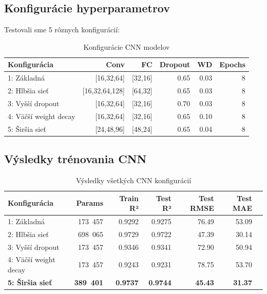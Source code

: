 \documentclass[a4paper, 12pt]{article}
\begin{document}
\subsection{Konfigurácie hyperparametrov}

Testovali sme 5 rôznych konfigurácií:

\begin{table}[H]
\centering
\small
\begin{tabular}{lrrrrr}
\toprule
\textbf{Konfigurácia} & \textbf{Conv} & \textbf{FC} & \textbf{Dropout} & \textbf{WD} & \textbf{Epochs} \\
\midrule
1: Základná & [16,32,64] & [32,16] & 0.65 & 0.03 & 8 \\
2: Hlbšia sieť & [16,32,64,128] & [64,32] & 0.65 & 0.03 & 8 \\
3: Vyšší dropout & [16,32,64] & [32,16] & 0.70 & 0.03 & 8 \\
4: Väčší weight decay & [16,32,64] & [32,16] & 0.65 & 0.10 & 8 \\
5: Širšia sieť & [24,48,96] & [48,24] & 0.65 & 0.04 & 8 \\
\bottomrule
\end{tabular}
\caption{Konfigurácie CNN modelov}
\end{table}

\clearpage

\subsection{Výsledky trénovania CNN}

\begin{table}[H]
\centering
\small
\begin{tabular}{lrrrrrr}
\toprule
\textbf{Konfigurácia} & \textbf{Params} & \textbf{Train R²} & \textbf{Test R²} & \textbf{Test RMSE} & \textbf{Test MAE} \\
\midrule
1: Základná & 173~457 & 0.9292 & 0.9275 & 76.49 & 53.09 \\
2: Hlbšia sieť & 698~065 & 0.9729 & 0.9722 & 47.39 & 30.14 \\
3: Vyšší dropout & 173~457 & 0.9346 & 0.9341 & 72.90 & 50.94 \\
4: Väčší weight decay & 173~457 & 0.9243 & 0.9231 & 78.75 & 53.70 \\
\textbf{5: Širšia sieť} & \textbf{389~401} & \textbf{0.9737} & \textbf{0.9744} & \textbf{45.43} & \textbf{31.37} \\
\bottomrule
\end{tabular}
\caption{Výsledky všetkých CNN konfigurácií}
\end{table}
\end{document}
